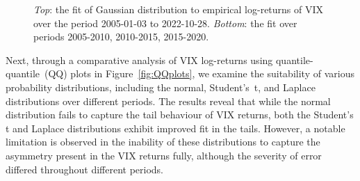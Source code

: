 \begin{figure}[htbp]
\begin{subfigure}[b]{\textwidth}
    \end{subfigure}
    \caption{\textit{Top}: the fit of Gaussian distribution to empirical log-returns of VIX over the period 2005-01-03 to 2022-10-28. \textit{Bottom}: the fit over periods 2005-2010, 2010-2015, 2015-2020.}
    \label{fig:VIX_dist}
\end{figure}

Next, through a comparative analysis of VIX log-returns using quantile-quantile~(QQ) plots in Figure~\ref{fig:QQplots}, we examine the suitability of various probability distributions, including the normal, Student's~t, and Laplace distributions over different periods. The results reveal that while the normal distribution fails to capture the tail behaviour of VIX returns, both the Student's t and Laplace distributions exhibit improved fit in the tails. However, a notable limitation is observed in the inability of these distributions to capture the asymmetry present in the VIX returns fully, although the severity of error differed throughout different periods.

